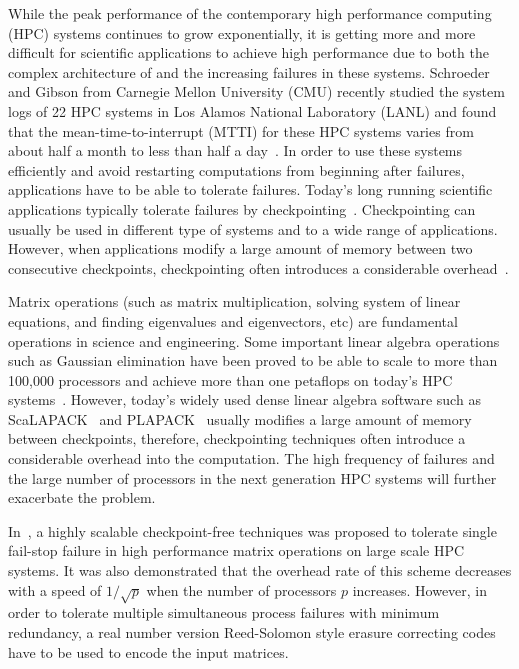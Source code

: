\documentclass{sig-alternate}
\begin{document}
While the peak performance of the contemporary high performance computing (HPC) systems
continues to grow exponentially, it is getting more and more difficult 
for scientific applications to achieve high performance due to both 
the complex architecture of and the increasing failures in these systems.
Schroeder and Gibson from Carnegie Mellon University (CMU) recently studied
the system logs of 22 HPC systems in Los Alamos National Laboratory (LANL)
and found that the mean-time-to-interrupt (MTTI) for these HPC 
systems varies from about half a month to less than half a day~\cite{gibson1:failure, gibson2:failure, gibson3:failure}. 
In order to use these systems efficiently and avoid restarting computations 
from beginning after failures, applications have to be able to tolerate failures.
Today's long running scientific applications typically tolerate failures by 
checkpointing~\cite{cappello:ft, chen:scalable-checkpointing, plank:dc,plank97:rscode, stellner:cocheck, wang:blcr}. 
Checkpointing can usually be used in different type of systems and to 
a wide range of applications. However, when applications modify 
a large amount of memory between two consecutive checkpoints, 
checkpointing often introduces a considerable overhead~\cite{kim96:abft, plank:abft}. 

Matrix operations (such as matrix multiplication, 
solving system of linear equations, and finding eigenvalues and eigenvectors, etc) 
are fundamental operations in science and engineering. Some important 
linear algebra operations such as Gaussian 
elimination have been proved to be able to scale to more than 100,000 
processors and achieve more than one petaflops on today's HPC systems~\cite{top500}. 
However, today's widely used dense linear algebra 
software such as ScaLAPACK~\cite{dongarra96:scalapack} and  PLAPACK~\cite{geijn:plapack}
usually modifies a large amount of memory between  checkpoints, therefore, 
checkpointing techniques often introduce a considerable overhead into the computation.
The high frequency of failures and the large number of processors in the
next generation HPC systems will further exacerbate the problem.

In~\cite{chen:abft}, a highly scalable checkpoint-free techniques was
proposed to tolerate single fail-stop failure in high performance 
matrix operations on large scale HPC systems. It was also 
demonstrated that the overhead rate of this scheme decreases 
with a speed of $1/\sqrt{p}$ when the number of processors $p$ increases. 
However, in order to tolerate multiple simultaneous process failures 
with minimum redundancy, a real number version Reed-Solomon style 
erasure correcting codes have to be used to encode the input matrices. 
\end{document}

